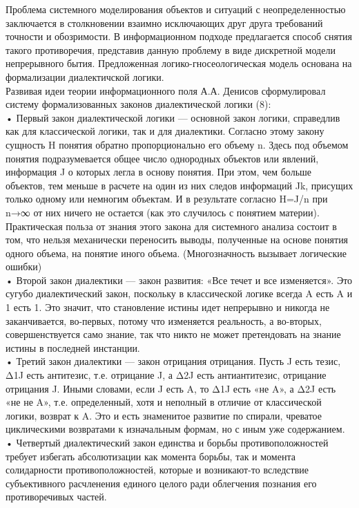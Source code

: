 \documentclass[a4paper,12pt]{report}
\begin{document}
Проблема системного моделирования объектов и ситуаций с неопределенностью заключается в столкновении взаимно исключающих друг друга требований точности и обозримости. В информационном подходе предлагается способ снятия такого противоречия, представив данную проблему в виде дискретной модели непрерывного бытия. Предложенная логико-гносеологическая модель основана на формализации диалектичской логики. \\
	Развивая идеи теории информационного поля А.А. Денисов сформулировал систему формализованных законов диалектической логики (8):\\
    • Первый закон диалектической логики — основной закон логики, справедлив как для классической логики, так и для диалектики. Согласно этому закону сущность H понятия обратно пропорционально его объему n. Здесь под объемом понятия подразумевается общее число однородных объектов или явлений, информация J о которых легла в основу понятия. При этом, чем больше объектов, тем меньше в расчете на один из них следов информаций Jk, присущих только одному или немногим объектам. И в результате согласно H=J/n при n→∞ от них ничего не остается (как это случилось с понятием материи).
Практическая польза от знания этого закона для системного анализа состоит в том, что нельзя механически переносить выводы, полученные на основе понятия одного объема, на понятие иного объема. (Многозначность вызывает логические ошибки)\\
    • Второй закон диалектики — закон развития: «Все течет и все изменяется». Это сугубо диалектический закон, поскольку в классической логике всегда A есть A и 1 есть 1. Это значит, что становление истины идет непрерывно и никогда не заканчивается, во-первых, потому что изменяется реальность, а во-вторых, совершенствуется само знание, так что никто не может претендовать на знание истины в последней инстанции.\\
    • Третий закон диалектики — закон отрицания отрицания. Пусть J есть тезис, Δ1J есть антитезис, т.е. отрицание J, а Δ2J есть антиантитезис, отрицание отрицания J. Иными словами, если J есть A, то Δ1J есть «не A», а Δ2J есть «не не A», т.е. определенный, хотя и неполный в отличие от классической логики, возврат к A. Это и есть знаменитое развитие по спирали, чреватое циклическими возвратами к изначальным формам, но с иным уже содержанием.\\
    • Четвертый диалектический закон единства и борьбы противоположностей требует избегать абсолютизации как момента борьбы, так и момента солидарности противоположностей, которые и возникают-то вследствие субъективного расчленения единого целого ради облегчения познания его противоречивых частей.\\
\end{document}

